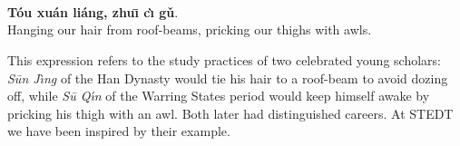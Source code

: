 \section*{}
\epigraph{\\
\textbf{Tóu xuán liáng, zhuı̄ cı̀ gǔ}.\\
Hanging our hair from roof-beams, pricking our thighs with awls.}{This expression refers to the study practices of two celebrated young scholars: \textit{Sūn Jı̀ng}  of the Han Dynasty would tie his hair to a roof-beam to avoid dozing off, while \textit{Sū Qı́n}  of the Warring States period would keep himself awake by pricking his thigh with an awl. Both later had distinguished careers. At STEDT we have been inspired by their example.}
